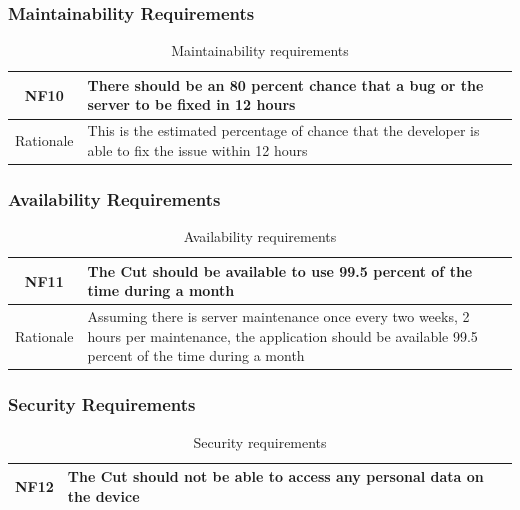 \documentclass[titlepage]{article}
\begin{document}
\subsubsection{Maintainability Requirements}
\begin{table}[H]
    \centering
    \begin{tabularx}{\textwidth}{|c|X|} \hline
        NF10 & There should be an 80 percent chance that a bug or the server to be fixed in 12 hours \\ \hline
        Rationale & This is the estimated percentage of chance that the developer is able to fix the issue within 12 hours \\ \hline
    \end{tabularx}
    \caption{Maintainability requirements}
    \label{tab:NonFunctional-Maintainability}
\end{table}

\subsubsection{Availability Requirements}
\begin{table}[H]
    \centering
    \begin{tabularx}{\textwidth}{|c|X|} \hline
        NF11 & The Cut should be available to use 99.5 percent of the time during a month \\ \hline
        Rationale & Assuming there is server maintenance once every two weeks, 2 hours per maintenance, the application should be available 99.5 percent of the time during a month \\ \hline
    \end{tabularx}
    \caption{Availability requirements}
    \label{tab:NonFunctional-Availability}
\end{table}

\subsubsection{Security Requirements}
\begin{table}[H]
    \centering
    \begin{tabularx}{\textwidth}{|c|X|} \hline
        NF12 & The Cut should not be able to access any personal data on the device \\ \hline
    \end{tabularx}
    \caption{Security requirements}
    \label{tab:NonFunctional-Security}
\end{table}
\end{document}
